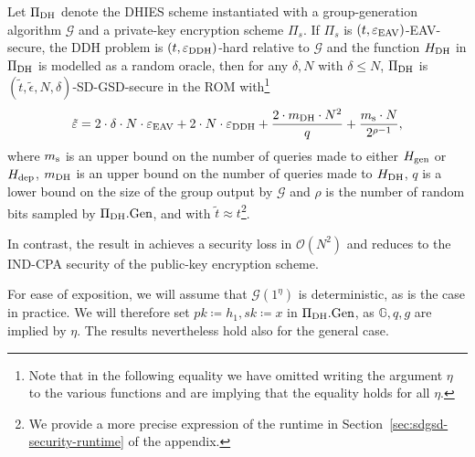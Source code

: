 \begin{theorem} \label{theorem:sdgsd-security}
	Let $\Pi_{\mathrm{DH}}$ denote the DHIES scheme instantiated with a group-generation algorithm $\mathcal{G}$ and a private-key encryption scheme $\Pi_s$. If $\Pi_s$ is $(t, \varepsilon_\mathrm{EAV})$-EAV-secure, the DDH problem is $(t, \varepsilon_\mathrm{DDH})$-hard relative to $\mathcal{G}$ and the function $H_\mathrm{DH}$ in $\Pi_{\mathrm{DH}}$ is modelled as a random oracle, then for any $\delta, N$ with $\delta \le N$, $\Pi_{\mathrm{DH}}$ is $(\tilde{t}, \tilde{\epsilon}, N, \delta)$-SD-GSD-secure in the ROM with\footnote{Note that in the following equality we have omitted writing the argument $\eta$ to the various functions and are implying that the equality holds for all $\eta$.}
	\[
		\tilde{\varepsilon} = 2 \cdot \delta \cdot N \cdot \varepsilon_\mathrm{EAV} + 2 \cdot N \cdot \varepsilon_\mathrm{DDH} + \frac{2 \cdot m_\mathrm{DH} \cdot N^2}{q} + \frac{m_\mathrm{s} \cdot N}{2^{\rho - 1}},
	\]
	where $m_\mathrm{s}$ is an upper bound on the number of queries made to either $H_\mathrm{gen}$ or $H_\mathrm{dep}$, $m_\mathrm{DH}$ is an upper bound on the number of queries made to $H_\mathrm{DH}$, $q$ is a lower bound on the size of the group output by $\mathcal{G}$ and $\rho$ is the number of random bits sampled by $\Pi_{\mathrm{DH}}.\mathrm{Gen}$, and with $\tilde{t} \approx t$\footnote{We provide a more precise expression of the runtime in Section~\ref{sec:sdgsd-security-runtime} of the appendix.}.
\end{theorem}

In contrast, the result in \cite{ttkem} achieves a security loss in $\mathcal{O}(N^2)$ and reduces to the IND-CPA security of the public-key encryption scheme.

For ease of exposition, we will assume that $\mathcal{G}(1^\eta)$ is deterministic, as is the case in practice. We will therefore set $pk \coloneqq h_1, sk \coloneqq x$ in $\Pi_{\mathrm{DH}}.\mathrm{Gen}$, as $\mathbb{G}, q, g$ are implied by $\eta$. The results nevertheless hold also for the general case.

